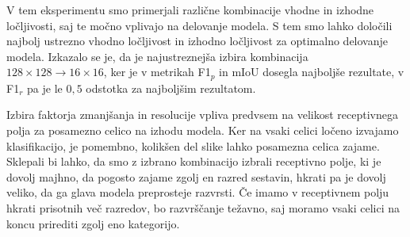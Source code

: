 \documentclass[a4paper,twoside,openright,12pt,slovene]{book}
\begin{document}
            V tem eksperimentu smo primerjali različne kombinacije vhodne in
            izhodne ločljivosti, saj te močno vplivajo na delovanje modela. S
            tem smo lahko določili najbolj ustrezno vhodno ločljivost in
            izhodno ločljivost za optimalno delovanje modela. Izkazalo se je,
            da je najustreznejša izbira kombinacija $128\times128 \rightarrow
            16\times16$, ker je v metrikah F1$_p$ in mIoU dosegla najboljše
            rezultate, v F1$_r$ pa je le $0{,}5$ odstotka za najboljšim
            rezultatom.

            Izbira faktorja zmanjšanja in resolucije vpliva predvsem na
            velikost receptivnega polja za posamezno celico na izhodu modela.
            Ker na vsaki celici ločeno izvajamo klasifikacijo, je
            pomembno, kolikšen del slike lahko posamezna celica zajame.
            Sklepali bi lahko, da smo z izbrano kombinacijo izbrali receptivno
            polje, ki je dovolj majhno, da pogosto zajame zgolj en razred
            sestavin, hkrati pa je dovolj veliko, da ga glava modela
            preprosteje razvrsti. Če imamo v receptivnem polju hkrati prisotnih
            več razredov, bo razvrščanje težavno, saj moramo vsaki celici na
            koncu prirediti zgolj eno kategorijo.

            
\end{document}
